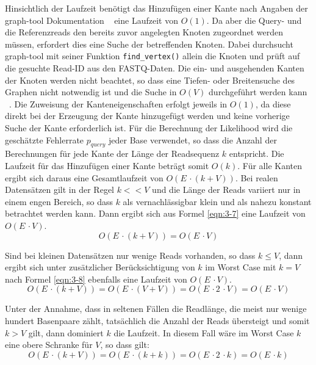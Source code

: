 Hinsichtlich der Laufzeit benötigt das Hinzufügen einer Kante nach Angaben der graph-tool Dokumentation ~\cite{docs_graph_tool} eine Laufzeit von $ O(1) $. Da aber die Query- und die Referenzreads den bereits zuvor angelegten Knoten zugeordnet werden müssen, erfordert dies eine Suche der betreffenden Knoten. Dabei durchsucht graph-tool mit seiner Funktion \lstinline|find_vertex()| allein die Knoten und prüft auf die gesuchte Read-ID aus den FASTQ-Daten. Die ein- und ausgehenden Kanten der Knoten werden nicht beachtet, so dass eine Tiefen- oder Breitensuche des Graphen nicht notwendig ist und die Suche in $ O(V) $ durchgeführt werden kann ~\cite{graph_tool_coplexity_find_vertex}. Die Zuweisung der Kanteneigenschaften erfolgt jeweils in $ O(1) $, da diese direkt bei der Erzeugung der Kante hinzugefügt werden und keine vorherige Suche der Kante erforderlich ist. Für die Berechnung der Likelihood wird die geschätzte Fehlerrate $ p_{query} $ jeder Base verwendet, so dass die Anzahl der Berechnungen für jede Kante der Länge der Readsequenz $ k $ entspricht. Die Laufzeit für das Hinzufügen einer Kante beträgt somit $ O(k) $. Für alle Kanten ergibt sich daraus eine Gesamtlaufzeit von $ O(E\, \cdotp (k + V)) $. Bei realen Datensätzen gilt in der Regel $ k << V $ und die Länge der Reads variiert nur in einem engen Bereich, so dass $ k $ als vernachlässigbar klein und als nahezu konstant betrachtet werden kann. Dann ergibt sich aus Formel \eqref{eqn:3-7} eine Laufzeit von $O(E\, \cdotp V) $. 
\begin{equation} \label{eqn:3-7}
\tag{3-7}
 O(E\, \cdotp (k + V)) = O(E\, \cdotp V)
\end{equation}

Sind bei kleinen Datensätzen nur wenige Reads vorhanden, so dass $ k \leq V $, dann ergibt sich unter zusätzlicher Berücksichtigung von $k$ im Worst Case mit $ k = V $ nach Formel \eqref{eqn:3-8} ebenfalls eine Laufzeit von $O(E\, \cdotp V) $.
\begin{equation} \label{eqn:3-8}
\tag{3-8}
O(E\, \cdotp (k + V)) = O(E\, \cdotp (V + V)) = O(E\, \cdotp 2 \, \cdotp V) = O(E\, \cdotp V)
\end{equation}

Unter der Annahme, dass in seltenen Fällen die Readlänge, die meist nur wenige hundert Basenpaare zählt, tatsächlich die Anzahl der Reads übersteigt und somit $ k > V $ gilt, dann dominiert $k$ die Laufzeit. In diesem Fall wäre im Worst Case $k$ eine obere Schranke für $V$, so dass gilt:
\begin{equation} \label{eqn:3-9}
\tag{3-9}
O(E\, \cdotp (k + V)) = O(E\, \cdotp (k + k)) = O(E\, \cdotp 2 \, \cdotp k) = O(E\, \cdotp k)
\end{equation}

